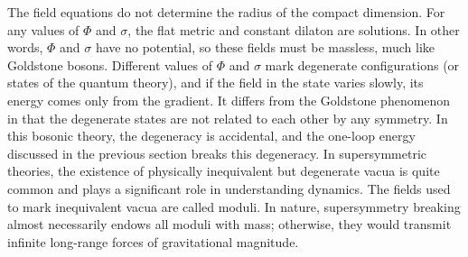 The field equations do not determine the radius of the compact dimension. For any values of $\Phi$ and $\sigma $, the flat metric and constant dilaton are solutions. In other words, $\Phi$ and $\sigma$ have no potential, so these fields must be massless, much like Goldstone bosons. Different values of $\Phi$ and $\sigma$ mark degenerate configurations (or states of the quantum theory), and if the field in the state varies slowly, its energy comes only from the gradient. It differs from the Goldstone phenomenon in that the degenerate states are not related to each other by any symmetry.
In this bosonic theory, the degeneracy is accidental, and the one-loop energy discussed in the previous section breaks this degeneracy. In supersymmetric theories, the existence of physically inequivalent but degenerate vacua is quite common and plays a significant role in understanding dynamics. The fields used to mark inequivalent vacua are called moduli. In nature, supersymmetry breaking almost necessarily endows all moduli with mass; otherwise, they would transmit infinite long-range forces of gravitational magnitude.
